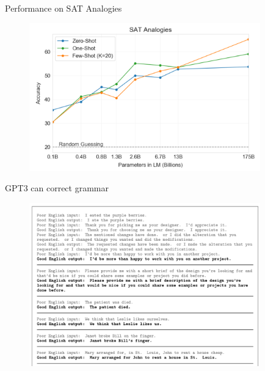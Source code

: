 \begin{vbframe}{Performance on SAT Analogies}

\vfill

	\begin{figure}
		\centering
		\includegraphics[width=10cm]{figure/satperf.png}
	\end{figure}

\vfill

\end{vbframe}




\begin{vbframe}{GPT3 can correct grammar}

\vfill

	\begin{figure}
		\centering
		\includegraphics[width=10cm]{figure/correctgrammar.png}
	\end{figure}

\vfill

\end{vbframe}





